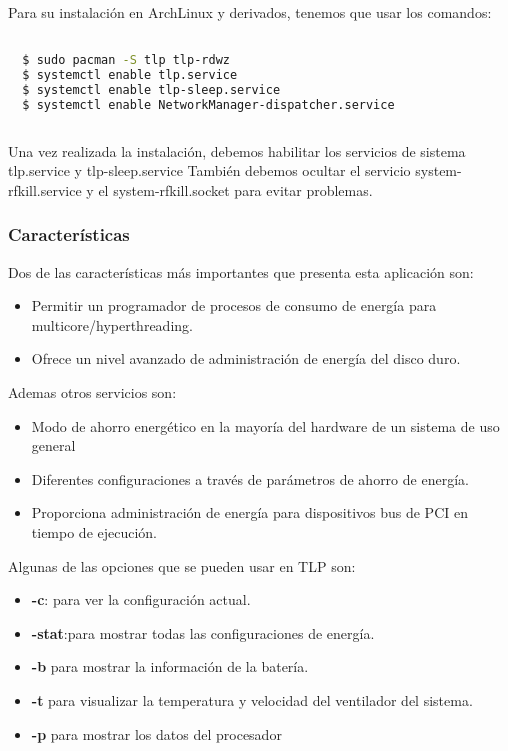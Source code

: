 \documentclass[12pt, spanish]{article}
\begin{document}
Para su instalación en ArchLinux y derivados, tenemos que usar los comandos: 

\begin{lstlisting}[language=bash]

  $ sudo pacman -S tlp tlp-rdwz
  $ systemctl enable tlp.service
  $ systemctl enable tlp-sleep.service
  $ systemctl enable NetworkManager-dispatcher.service
  
\end{lstlisting}

Una vez realizada la instalación, debemos habilitar los servicios de sistema tlp.service y tlp-sleep.service
También debemos ocultar el servicio system-rfkill.service y el system-rfkill.socket para evitar problemas.

\subsubsection{Características}

Dos de las características más importantes que presenta esta aplicación son: 

\begin{itemize}

\item{Permitir un programador de procesos de consumo de energía para multicore/hyperthreading.}
\item{Ofrece un nivel avanzado de administración de energía del disco duro.}

\end{itemize}

Ademas otros servicios son:

\begin{itemize}
\item{Modo de ahorro energético en la mayoría del hardware de un sistema de uso general}
\item{Diferentes configuraciones a través de parámetros de ahorro de energía.}
\item{Proporciona administración de energía para dispositivos bus de PCI en tiempo de ejecución.}
\end{itemize}

Algunas de las opciones que se pueden usar en TLP son:

\begin{itemize}
\item{\textbf{-c}: para ver la configuración actual.}
\item{\textbf{-stat}:para mostrar todas las configuraciones de energía.}
\item{\textbf{-b} para mostrar la información de la batería.}
\item{\textbf{-t} para visualizar la temperatura y velocidad del ventilador del sistema.}
\item{\textbf{-p} para mostrar los datos del procesador}
\end{itemize}
\end{document}
